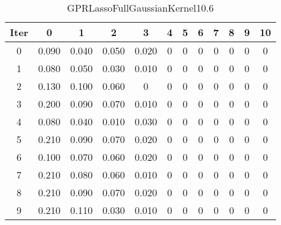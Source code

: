 \begin{table}
	\begin{center}
		\begin{tabular}{|c|c|c|c|c|c|c|c|c|c|c|c|}
			\hline
			Iter & 0 & 1 & 2 & 3 & 4 & 5 & 6 & 7 & 8 & 9 & 10 \\
			\hline
			0 & 0.090 & 0.040 & 0.050 & 0.020 & 0 & 0 & 0 & 0 & 0 & 0 & 0 \\
			\hline
			1 & 0.080 & 0.050 & 0.030 & 0.010 & 0 & 0 & 0 & 0 & 0 & 0 & 0 \\
			\hline
			2 & 0.130 & 0.100 & 0.060 & 0 & 0 & 0 & 0 & 0 & 0 & 0 & 0 \\
			\hline
			3 & 0.200 & 0.090 & 0.070 & 0.010 & 0 & 0 & 0 & 0 & 0 & 0 & 0 \\
			\hline
			4 & 0.080 & 0.040 & 0.010 & 0.030 & 0 & 0 & 0 & 0 & 0 & 0 & 0 \\
			\hline
			5 & 0.210 & 0.090 & 0.070 & 0.020 & 0 & 0 & 0 & 0 & 0 & 0 & 0 \\
			\hline
			6 & 0.100 & 0.070 & 0.060 & 0.020 & 0 & 0 & 0 & 0 & 0 & 0 & 0 \\
			\hline
			7 & 0.210 & 0.080 & 0.060 & 0.010 & 0 & 0 & 0 & 0 & 0 & 0 & 0 \\
			\hline
			8 & 0.210 & 0.090 & 0.070 & 0.020 & 0 & 0 & 0 & 0 & 0 & 0 & 0 \\
			\hline
			9 & 0.210 & 0.110 & 0.030 & 0.010 & 0 & 0 & 0 & 0 & 0 & 0 & 0 \\
			\hline
		\end{tabular}
	\end{center}
	\caption{GPRLassoFullGaussianKernel10.6}
\end{table}